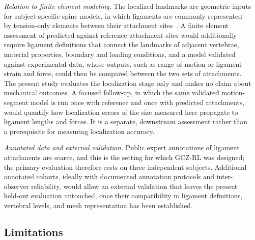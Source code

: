 \documentclass[5p,times,twocolumn,authoryear]{elsarticle}
\newif\ifhighlight
\newcommand{\revstart}{\ifhighlight\begingroup\color{revcolor}\fi}
\newcommand{\revend}{\ifhighlight\par\endgroup\fi}
\begin{document}
\revstart
\emph{Relation to finite element modeling.} The localized landmarks are geometric inputs for subject-specific spine models, in which ligaments are commonly represented by tension-only elements between their attachment sites~\citep{dreischarf2014}. A finite element assessment of predicted against reference attachment sites would additionally require ligament definitions that connect the landmarks of adjacent vertebrae, material properties, boundary and loading conditions, and a model validated against experimental data, whose outputs, such as range of motion or ligament strain and force, could then be compared between the two sets of attachments. The present study evaluates the localization stage only and makes no claim about mechanical outcomes. A focused follow-up, in which the same validated motion-segment model is run once with reference and once with predicted attachments, would quantify how localization errors of the size measured here propagate to ligament lengths and forces. It is a separate, downstream assessment rather than a prerequisite for measuring localization accuracy.

\emph{Annotated data and external validation.} Public expert annotations of ligament attachments are scarce, and this is the setting for which GCZ-RL was designed; the primary evaluation therefore rests on three independent subjects. Additional annotated cohorts, ideally with documented annotation protocols and inter-observer reliability, would allow an external validation that leaves the present held-out evaluation untouched, once their compatibility in ligament definitions, vertebral levels, and mesh representation has been established.
\revend

\subsection{Limitations}
\end{document}
